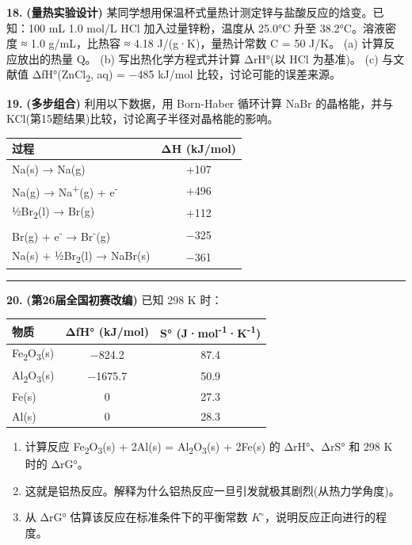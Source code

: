 \documentclass[a4paper,11pt]{ctexart}
\providecommand{\tightlist}{\setlength{\itemsep}{0pt}\setlength{\parskip}{0pt}}
\newcounter{none}
\begin{document}
\textbf{18.} \textbf{(量热实验设计)} 某同学想用保温杯式量热计测定锌与盐酸反应的焓变。已知：100 mL 1.0 mol/L HCl 加入过量锌粉，温度从 25.0°C 升至 38.2°C。溶液密度 ≈ 1.0 g/mL，比热容 ≈ 4.18 J/(g·K)，量热计常数 C = 50 J/K。
(a) 计算反应放出的热量 Q。
(b) 写出热化学方程式并计算 ΔrH°(以 HCl 为基准)。
(c) 与文献值 ΔfH°(ZnCl\textsubscript{2}, aq) = −485 kJ/mol 比较，讨论可能的误差来源。

\textbf{19.} \textbf{(多步组合)} 利用以下数据，用 Born-Haber 循环计算 NaBr 的晶格能，并与 KCl(第15题结果)比较，讨论离子半径对晶格能的影响。

{\def\LTcaptype{none} %
\begin{longtable}[]{@{}lc@{}}
\toprule\noalign{}
过程 & ΔH (kJ/mol) \\
\midrule\noalign{}
\endhead
\bottomrule\noalign{}
\endlastfoot
Na(s) → Na(g) & +107 \\
Na(g) → Na\textsuperscript{+}(g) + e\textsuperscript{-} & +496 \\
½Br\textsubscript{2}(l) → Br(g) & +112 \\
Br(g) + e\textsuperscript{-} → Br\textsuperscript{-}(g) & −325 \\
Na(s) + ½Br\textsubscript{2}(l) → NaBr(s) & −361 \\
\end{longtable}
}

\begin{center}\rule{0.5\linewidth}{0.5pt}\end{center}

\textbf{20.} \textbf{(第26届全国初赛改编)} 已知 298 K 时：

{\def\LTcaptype{none} %
\begin{longtable}[]{@{}lcc@{}}
\toprule\noalign{}
物质 & ΔfH° (kJ/mol) & S° (J·mol\textsuperscript{-1}·K\textsuperscript{-1}) \\
\midrule\noalign{}
\endhead
\bottomrule\noalign{}
\endlastfoot
Fe\textsubscript{2}O\textsubscript{3}(s) & −824.2 & 87.4 \\
Al\textsubscript{2}O\textsubscript{3}(s) & −1675.7 & 50.9 \\
Fe(s) & 0 & 27.3 \\
Al(s) & 0 & 28.3 \\
\end{longtable}
}

\begin{enumerate}
\def\labelenumi{(\alph{enumi})}
\tightlist
\item
  计算反应 Fe\textsubscript{2}O\textsubscript{3}(s) + 2Al(s) = Al\textsubscript{2}O\textsubscript{3}(s) + 2Fe(s) 的 ΔrH°、ΔrS° 和 298 K 时的 ΔrG°。
\item
  这就是铝热反应。解释为什么铝热反应一旦引发就极其剧烈(从热力学角度)。
\item
  从 ΔrG° 估算该反应在标准条件下的平衡常数 \(K^{\circ}\)，说明反应正向进行的程度。
\end{enumerate}
\end{document}
